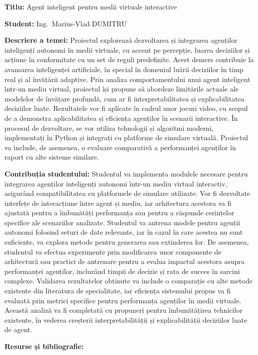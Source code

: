 \documentclass[12pt,a4paper]{article}
\begin{document}
\textbf{Titlu:} Agent inteligent pentru medii virtuale interactive

\textbf{Student:} Ing.\ Marius-Vlad DUMITRU

\textbf{Descriere a temei:} Proiectul explorează dezvoltarea și integrarea agenților inteligenți autonomi în medii virtuale, cu accent pe percepție, luarea deciziilor și acțiune în conformitate cu un set de reguli predefinite. Acest demers contribuie la avansarea inteligenței artificiale, în special în domeniul luării deciziilor în timp real și al învățării adaptive. Prin analiza comportamentului unui agent inteligent într-un mediu virtual, proiectul își propune să abordeze limitările actuale ale modelelor de învățare profundă, cum ar fi interpretabilitatea și explicabilitatea deciziilor luate. Rezultatele vor fi aplicate în cadrul unor jocuri video, cu scopul de a demonstra aplicabilitatea și eficiența agenților în scenarii interactive. În procesul de dezvoltare, se vor utiliza tehnologii și algoritmi moderni, implementați în Python și integrați cu platforme de simulare virtuală. Proiectul va include, de asemenea, o evaluare comparativă a performanței agenților în raport cu alte sisteme similare.

\textbf{Contribuția studentului:} Studentul va implementa modulele necesare pentru integrarea agenților inteligenți autonomi într-un mediu virtual interactiv, asigurând compatibilitatea cu platformele de simulare utilizate. Vor fi dezvoltate interfețe de interacțiune între agent și mediu, iar arhitectura acestora va fi ajustată pentru a îmbunătăți performanța sau pentru a răspunde cerințelor specifice ale scenariilor analizate. Studentul va antrena modele pentru agenții autonomi folosind seturi de date relevante, iar în cazul în care acestea nu sunt suficiente, va explora metode pentru generarea sau extinderea lor. De asemenea, studentul va efectua experimente prin modificarea unor componente de arhitectură sau practici de antrenare pentru a evalua impactul acestora asupra performanței agenților, incluzând timpii de decizie și rata de succes în sarcini complexe. Validarea rezultatelor obținute va include o comparație cu alte metode existente din literatura de specialitate, iar eficiența sistemului propus va fi evaluată prin metrici specifice pentru performanța agenților în medii virtuale. Această analiză va fi completată cu propuneri pentru îmbunătățirea tehnicilor existente, în vederea creșterii interpretabilității și explicabilității deciziilor luate de agent.

\textbf{Resurse și bibliografie:}
\end{document}
